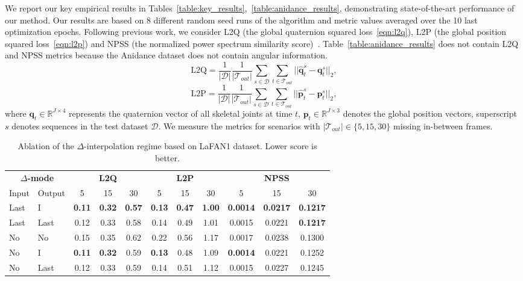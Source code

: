 \documentclass[letterpaper]{article} \usepackage[]{aaai23}  \usepackage{times}  \usepackage{helvet}  \usepackage{courier}  \usepackage[hyphens]{url}  \usepackage{graphicx} \urlstyle{rm} \def\UrlFont{\rm}  \usepackage{natbib}  \usepackage{caption} \frenchspacing  \setlength{\pdfpagewidth}{8.5in} \setlength{\pdfpageheight}{11in}
\renewcommand{\vec}[1]{\mathbf{#1}}
\begin{document}
We report our key empirical results in Tables~\ref{table:key_results},~\ref{table:anidance_results}, demonstrating state-of-the-art performance of our method. Our results are based on 8 different random seed runs of the algorithm and metric values averaged over the 10 last optimization epochs. Following previous work, we consider L2Q (the global quaternion squared loss~\eqref{eqn:l2q}), L2P (the global position squared loss~\eqref{eqn:l2p}) and NPSS (the normalized power spectrum similarity score)~\cite{gopalakrishnan2019neural}. Table~\ref{table:anidance_results} does not contain L2Q and NPSS metrics because the Anidance dataset does not contain angular information.
\begin{equation} \label{eqn:l2q}
    \text{L2Q} = \frac{1}{|\mathcal{D}|}\frac{1}{|\mathcal{T}_{out}|} \sum_{s \in \mathcal{D}} \sum_{t \in \mathcal{T}_{out}}  ||\widehat{\vec{q}}_t^s - \vec{q}_t^s ||_2, 
\end{equation}
\begin{equation} \label{eqn:l2p}
    \text{L2P} = \frac{1}{|\mathcal{D}|}\frac{1}{|\mathcal{T}_{out}|} \sum_{s \in \mathcal{D}} \sum_{t \in \mathcal{T}_{out}}  ||\widehat{\vec{p}}_t^s - \vec{p}_t^s ||_2,
\end{equation}
where $\vec{q}_t\in\mathbb{R}^{J \times 4}$ represents the quaternion vector of all skeletal joints at time $t$, $\vec{p}_t\in\mathbb{R}^{J\times 3}$ denotes the global position vectors, superscript $s$ denotes sequences in the test dataset $\mathcal{D}$. We measure the metrics for scenarios with $|\mathcal{T}_{out}| \in \{5, 15, 30\}$ missing in-between frames.  

\begin{table*}[!ht]
\centering
\caption{Ablation of the $\Delta$-interpolation regime based on LaFAN1 dataset. Lower score is better.}
\centering
\begin{tabular}{llccccccccc}
\multicolumn{2}{c}{\textbf{$\Delta$-mode}} &\multicolumn{3}{c}{\textbf{L2Q}} &\multicolumn{3}{c}{\textbf{L2P}} &\multicolumn{3}{c}{\textbf{NPSS}} \\
\cmidrule(lr){3-5}\cmidrule(lr){6-8}\cmidrule(lr){9-11}
Input & Output & 5 & 15 & 30 & 5 & 15 & 30 & 5 & 15 & 30\\
\cmidrule(lr){1-11}
Last & I & \bf{0.11}	& \bf{0.32} &	\bf{0.57} &	\bf{0.13} &	\bf{0.47} &	\bf{1.00} &	\bf{0.0014} &	\bf{0.0217} &	\bf{0.1217} \\
Last & Last & 0.12 & 0.33 & 0.58 & 0.14 & 0.49 & 1.01 & 0.0015 & 0.0221 & \bf{0.1217} \\
No & No &  0.15 & 0.35 & 0.62 & 0.22 & 0.56 & 1.17 & 0.0017 & 0.0238 & 0.1300 \\
No & I &  \bf{0.11}  & \bf{0.32} & 0.59 & \bf{0.13} & 0.48 & 1.09 & \bf{0.0014} & 0.0221 & 0.1252 \\
No & Last &  0.12 & 0.33 & 0.59 & 0.14 & 0.51 & 1.12 & 0.0015 & 0.0227 & 0.1245 \\ 
\cmidrule(lr){1-11}
\end{tabular}
\label{tab:ablation_delta}
\end{table*}
\end{document}
